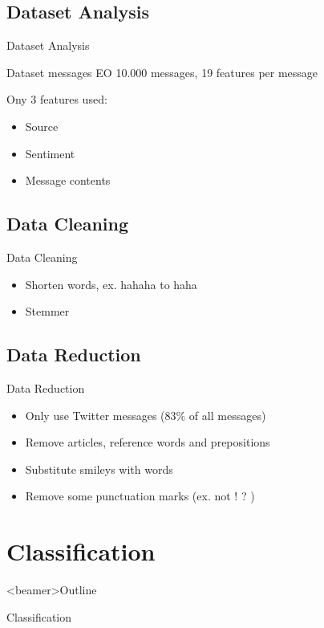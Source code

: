 \documentclass{beamer}
\begin{document}
\subsection{Dataset Analysis}
\begin{frame}{Dataset Analysis}
\begin{block}{Dataset messages EO}
10.000 messages, 19 features per message
\end{block}
Ony 3 features used: \\
\begin{itemize}
\item Source
\item Sentiment
\item Message contents
\end{itemize}
\end{frame}

\subsection{Data Cleaning}
\begin{frame}{Data Cleaning}
\begin{itemize}
\item Shorten words, ex. hahaha to haha
\item Stemmer
\end{itemize}
\end{frame}

\subsection{Data Reduction}
\begin{frame}{Data Reduction}
\begin{itemize}
\item Only use Twitter messages (83\% of all messages)
\item Remove articles, reference words and prepositions
\item Substitute smileys with words
\item Remove some punctuation marks (ex. not ! ? )
\end{itemize}
\end{frame}

\section{Classification}
\begin{frame}<beamer>{Outline}
    \setcounter{tocdepth}{2}
    \tableofcontents[
    currentsubsection, 
    hideothersubsections, 
    sectionstyle=show/hide] 
  \end{frame}
\begin{frame}{Classification}
\end{frame}
\end{document}
